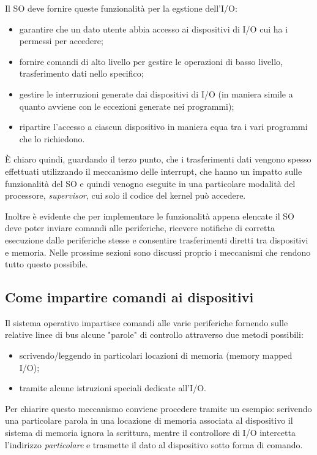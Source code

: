 \documentclass[class=book, crop=false, oneside]{standalone}
\begin{document}
Il SO deve fornire queste funzionalità per la egstione dell'I/O:
\begin{itemize}
	\item garantire che un dato utente abbia accesso ai dispositivi di I/O cui ha i permessi per accedere;
	\item fornire comandi di alto livello per gestire le operazioni di basso livello, trasferimento dati nello specifico;
	\item gestire le interruzioni generate dai dispositivi di I/O (in maniera simile a quanto avviene con le eccezioni generate nei programmi);
	\item ripartire l’accesso a ciascun dispositivo in maniera equa tra i vari programmi che lo richiedono.
\end{itemize}
È chiaro quindi, guardando il terzo punto, che i trasferimenti dati vengono spesso effettuati utilizzando il meccanismo delle interrupt, che hanno un impatto sulle funzionalità del SO e quindi venogno eseguite in una particolare modalità del processore, \emph{supervisor}, cui solo il codice del kernel può accedere.

Inoltre è evidente che per implementare le funzionalità appena elencate il SO deve poter inviare comandi alle periferiche, ricevere notifiche di corretta esecuzione dalle periferiche stesse e consentire trasferimenti diretti tra dispositivi e memoria. Nelle prossime sezioni sono discussi proprio i meccanismi che rendono tutto questo possibile.

\subsection{Come impartire comandi ai dispositivi}
Il sistema operativo impartisce comandi alle varie periferiche fornendo sulle relative linee di bus alcune "parole" di controllo attraverso due metodi possibili:
\begin{itemize}
	\item scrivendo/leggendo in particolari locazioni di memoria (memory mapped I/O);
	\item tramite alcune istruzioni speciali dedicate all’I/O.
\end{itemize}

Per chiarire questo meccanismo conviene procedere tramite un esempio:
scrivendo una particolare parola in una locazione di memoria associata al dispositivo il sistema di memoria ignora la scrittura, mentre il controllore di I/O intercetta l’indirizzo \emph{particolare} e trasmette il dato al dispositivo sotto forma di comando.
\end{document}
